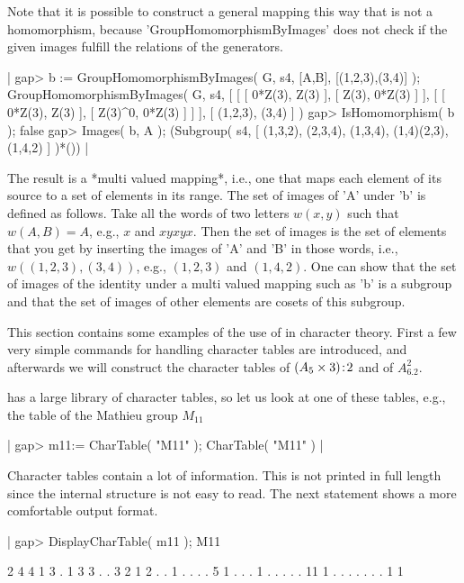 Note that it is possible to construct  a general mapping this way that is
not a homomorphism, because 'GroupHomomorphismByImages' does not check if
the given images fulfill the relations of the generators.

|    gap> b := GroupHomomorphismByImages( G, s4, [A,B], [(1,2,3),(3,4)] );
    GroupHomomorphismByImages( G, s4,
    [ [ [ 0*Z(3), Z(3) ], [ Z(3), 0*Z(3) ] ],
      [ [ 0*Z(3), Z(3) ], [ Z(3)^0, 0*Z(3) ] ] ], [ (1,2,3), (3,4) ] )
    gap> IsHomomorphism( b );
    false
    gap> Images( b, A );
    (Subgroup( s4, [ (1,3,2), (2,3,4), (1,3,4), (1,4)(2,3), (1,4,2)
     ] )*()) |

The result is a *multi valued mapping*, i.e., one that  maps each element
of its source to a set of elements in its range.   The set of  images  of
'A' under 'b' is defined as follows.  Take all the words  of  two letters
$w( x, y )$ such that $w( A, B ) = A$, e.g., $x$ and $x y  x  y x$.  Then
the set of images is the set of  elements  that you get by  inserting the
images of 'A' and 'B' in  those words, i.e., $w( (1,2,3), (3,4) )$, e.g.,
$(1,2,3)$ and $(1,4,2)$.  One can  show  that the set  of  images  of the
identity under a multi valued mapping such as  'b' is a subgroup and that
the set of images of other elements are cosets of this subgroup.


\def\colon{\char58}

This  section contains some examples  of the use  of {\GAP}  in character
theory.  First a few very  simple commands for  handling character tables
are  introduced, and afterwards we will construct the character tables of
$(A_5\times 3)\!\colon\!2$ and of $A_6.2^2$.

{\GAP} has  a large library of character tables, so let us look at one of
these tables, e.g., the table of the Mathieu group $M_{11}$\:

|    gap> m11:= CharTable( "M11" );
    CharTable( "M11" ) |

Character tables contain a lot of information.  This is not printed in
full length since the internal structure is not easy to read.  The next
statement shows a more comfortable output format.

|    gap> DisplayCharTable( m11 );
    M11

          2  4  4  1  3  .  1  3  3   .   .
          3  2  1  2  .  .  1  .  .   .   .
          5  1  .  .  .  1  .  .  .   .   .
         11  1  .  .  .  .  .  .  .   1   1

